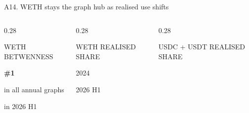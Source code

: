 







\begin{frame}{A14. WETH stays the graph hub as realised use shifts}
\vspace{0.18cm}
\begin{columns}[T,totalwidth=0.92\textwidth]
\begin{column}{0.28\textwidth}
{\color{muted}\scriptsize WETH BETWENNESS\par}
{\fontsize{23}{25}\selectfont\bfseries\color{ucldark}\#1}\par
{\small in all \NetworkWethRankYears{} annual graphs\par}
\vspace{0.18cm}
{\large\bfseries\color{ucldark}\NetworkWethBetweennessTwentySix}\par
{\small in 2026 H1\par}
\end{column}
\hfill
\begin{column}{0.28\textwidth}
{\color{muted}\scriptsize WETH REALISED SHARE\par}
{\fontsize{22}{24}\selectfont\bfseries\color{ucldark}\NetworkWethPositionTwentyFour}\par
{\small 2024\par}
\vspace{0.16cm}
{\fontsize{22}{24}\selectfont\bfseries\color{accent}\NetworkWethPositionTwentySix}\par
{\small 2026 H1\par}
\end{column}
\hfill
\begin{column}{0.28\textwidth}
{\color{muted}\scriptsize USDC + USDT REALISED SHARE\par}
{\fontsize{22}{24}\selectfont\bfseries\color{muted}\NetworkStableDuoPositionTwentyFour}\par

\end{column}
\end{columns}
\end{frame}
